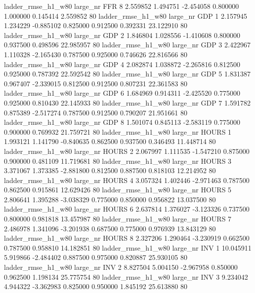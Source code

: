  ladder_rmse_h1_w80   large_nr      FFR                 8  2.559852  1.494751  -2.454058 0.800000 1.000000  0.145414    2.559852 80
 ladder_rmse_h1_w80   large_nr      GDP                 1  2.157945  1.234229  -0.885102 0.825000 0.912500  0.392331   23.122910 80
 ladder_rmse_h1_w80   large_nr      GDP                 2  1.846804  1.028556  -1.410608 0.800000 0.937500  0.498596   22.985957 80
 ladder_rmse_h1_w80   large_nr      GDP                 3  2.422967  1.110328  -2.165430 0.787500 0.925000  0.746626   22.816566 80
 ladder_rmse_h1_w80   large_nr      GDP                 4  2.082874  1.038872  -2.265816 0.812500 0.925000  0.787392   22.592542 80
 ladder_rmse_h1_w80   large_nr      GDP                 5  1.831387  0.967407  -2.339015 0.812500 0.912500  0.807231   22.361583 80
 ladder_rmse_h1_w80   large_nr      GDP                 6  1.684969  0.914311  -2.425520 0.775000 0.925000  0.810430   22.145933 80
 ladder_rmse_h1_w80   large_nr      GDP                 7  1.591782  0.875389  -2.517274 0.787500 0.912500  0.790207   21.951661 80
 ladder_rmse_h1_w80   large_nr      GDP                 8  1.501074  0.845113  -2.583119 0.775000 0.900000  0.769932   21.759721 80
 ladder_rmse_h1_w80   large_nr    HOURS                 1  1.993121  1.141790  -0.840635 0.862500 0.937500  0.346493   11.448714 80
 ladder_rmse_h1_w80   large_nr    HOURS                 2  2.067997  1.111535  -1.547210 0.875000 0.900000  0.481109   11.719681 80
 ladder_rmse_h1_w80   large_nr    HOURS                 3  3.371067  1.373385  -2.881800 0.812500 0.887500  0.818103   12.214952 80
 ladder_rmse_h1_w80   large_nr    HOURS                 4  3.057324  1.402446  -2.971463 0.787500 0.862500  0.915861   12.629426 80
 ladder_rmse_h1_w80   large_nr    HOURS                 5  2.806641  1.395288  -3.038329 0.775000 0.850000  0.956822   13.037500 80
 ladder_rmse_h1_w80   large_nr    HOURS                 6  2.637814  1.376027  -3.123326 0.737500 0.800000  0.981818   13.457987 80
 ladder_rmse_h1_w80   large_nr    HOURS                 7  2.486978  1.341096  -3.201938 0.687500 0.775000  0.976939   13.843129 80
 ladder_rmse_h1_w80   large_nr    HOURS                 8  2.327206  1.290464  -3.230919 0.662500 0.787500  0.958810   14.182851 80
 ladder_rmse_h1_w80   large_nr      INV                 1 10.045911  5.919866  -2.484402 0.887500 0.975000  0.820887   25.930105 80
 ladder_rmse_h1_w80   large_nr      INV                 2  8.827504  5.004150  -2.967958 0.850000 0.962500  1.198134   25.775754 80
 ladder_rmse_h1_w80   large_nr      INV                 3  9.234042  4.944322  -3.362983 0.825000 0.950000  1.845192   25.613880 80
